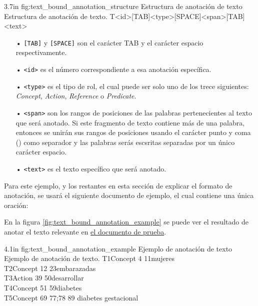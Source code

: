 \begin{annexample}
	[backgroundcolor=green!13]
	{3.7in}
	{fig:text_bound_annotation_structure}
	{Estructura de anotación de texto}
	{Estructura de anotación de texto.}
	T<id>[TAB]<type>[SPACE]<span>[TAB]<text>
\end{annexample}

\begin{itemize}
	\item[•] \texttt{[TAB]} y \texttt{[SPACE]} son el carácter TAB y el carácter espacio respectivamente.
	\vspace{-0.1in}
	\item[•] \texttt{<id>} es el número correspondiente a esa anotación específica.
	\vspace{-0.1in}
	\item[•] \texttt{<type>} es el tipo de rol, el cual puede ser solo uno de los trece siguientes: {\it Concept}, {\it Action}, {\it Reference} o {\it Predicate}.
	\vspace{-0.1in}
	\item[•] \texttt{<span>} son los rangos de posiciones de las palabras pertenecientes al texto que será anotado. Si este fragmento de texto contiene más de una palabra, entonces se unirán sus rangos de posiciones usando el carácter punto y coma (\doublequote{\texttt{;}}) como separador y las palabras serás escsritas separadas por un único carácter espacio.
	\vspace{-0.1in}
	\item[•] \texttt{<text>} es el texto específico que será anotado.
\end{itemize}

Para este ejemplo, y los restantes en esta sección de explicar el formato de anotación, se usará el siguiente documento de ejemplo, el cual contiene una única oración:
\begin{center}
	\label{sentence:annotation_example}
\end{center}

En la figura \ref{fig:text_bound_annotation_example} se puede ver el resultado de anotar el texto relevante en \hyperref[sentence:annotation_example]{el documento de prueba}.

\begin{annexample}
	[backgroundcolor=cyan!13]
	{4.1in}
	{fig:text_bound_annotation_example}
	{Ejemplo de anotación de texto}
	{Ejemplo de anotación de texto.}
	T1\space\space Concept 4 11\space\space\space\space mujeres\\
	T2\space\space Concept 12 23\space\space\space embarazadas\\
	T3\space\space Action 39 50\space\space\space\space desarrollar\\
	T4\space\space Concept 51 59\space\space\space diabetes\\
	T5\space\space Concept 69 77;78 89 diabetes gestacional
\end{annexample}

